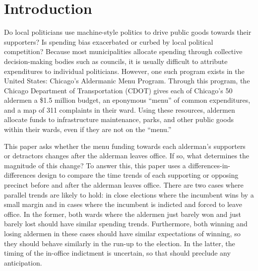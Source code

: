 \section{Introduction}\label{sec:Introduction}

Do local politicians use machine-style politics to drive public goods towards their supporters? Is spending bias exacerbated or curbed by local political competition?
Because most municipalities allocate spending through collective decision-making bodies such as councils, it is usually difficult to attribute expenditures to individual politicians.
However, one such program exists in the United States: Chicago's Aldermanic Menu Program.
Through this program, the Chicago Department of Transportation (CDOT) gives each of Chicago's 50 aldermen a \$1.5 million budget, an eponymous ``menu'' of common expenditures, and a map of 311 complaints in their ward.
Using these resources, aldermen allocate funds to infrastructure maintenance, parks, and other public goods within their wards, even if they are not on the ``menu.''

This paper asks whether the menu funding towards each alderman's supporters or detractors changes after the alderman leaves office.
If so, what determines the magnitude of this change? 
To answer this, this paper uses a differences-in-differences design to compare the time trends of each supporting or opposing precinct before and after the alderman leaves office.
There are two cases where parallel trends are likely to hold: in close elections where the incumbent wins by a small margin and in cases where the incumbent is indicted and forced to leave office.
In the former, both wards where the aldermen just barely won and just barely lost should have similar spending trends.
Furthermore, both winning and losing aldermen in these cases should have similar expectations of winning, so they should behave similarly in the run-up to the election.
In the latter, the timing of the in-office indictment is uncertain, so that should preclude any anticipation.


